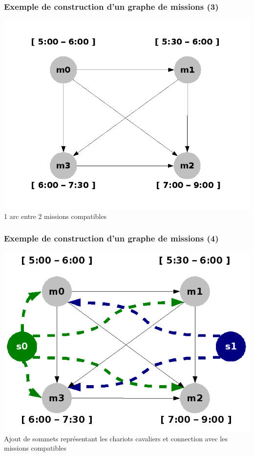 \documentclass{beamer}
\begin{document}
\begin{frame}
	\frametitle{Exemple de construction d'un graphe de missions (3)}
 	\begin{center}
 		\includegraphics[height=.50\textheight]{fig/precedence.png} \\

		1 arc entre 2 missions compatibles
	\end{center}
\end{frame}
\begin{frame}
	\frametitle{Exemple de construction d'un graphe de missions (4)}
 	\begin{center}
 		\includegraphics[height=.50\textheight]{fig/precedence_with_vehicles.png}\\
		Ajout de sommets représentant les chariots cavaliers et connection avec les missions compatibles
	\end{center}
\end{frame}
\end{document}
